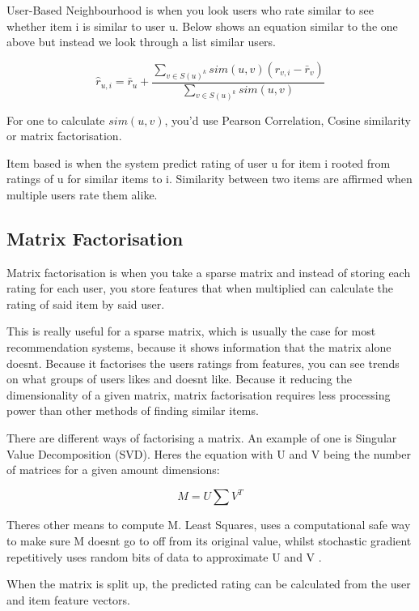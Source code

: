 User-Based Neighbourhood is when you look users who rate similar to see whether item i is similar to user u. Below shows an equation similar to the one above but instead we look through a list similar users.

\begin{equation}
	\hat{r} _{u,i} = \bar{r}_{u} + \frac{ \sum _{v \in S(u)^{k}} sim(u ,v) ( r_{v, i} - \bar{r}_{v})}{\sum _{v \in S(u)^{k}} sim(u , v)}
\end{equation}

For one to calculate $sim(u , v)$, you'd use Pearson Correlation, Cosine similarity or matrix factorisation.

Item based is when the system predict rating of user u for item i rooted from ratings of u for similar items to i. Similarity between two items are affirmed when multiple users rate them alike.

\subsection{Matrix Factorisation}

Matrix factorisation is when you take a sparse matrix and instead of storing each rating for each user, you store features that when multiplied can calculate the rating of said item by said user.

This is really useful for a sparse matrix, which is usually the case for most recommendation systems, because it shows information that the matrix alone doesnt. Because it factorises the users ratings from features, you can see trends on what groups of users likes and doesnt like. Because it reducing the dimensionality of a given matrix, matrix factorisation requires less processing power than other methods of finding similar items. 

There are different ways of factorising a matrix. An example of one is Singular Value Decomposition (SVD). Heres the equation with U and V being the number of matrices for a given amount dimensions:

\begin{equation}
	M = U \sum V ^{T}
\end{equation}

Theres other means to compute M. Least Squares, uses a computational safe way to make sure M doesnt go to off from its original value, whilst stochastic gradient repetitively uses random bits of data to approximate U and V \citep{koren_matrix_2009}. 

When the matrix is split up, the predicted rating can be calculated from the user and item feature vectors. 

